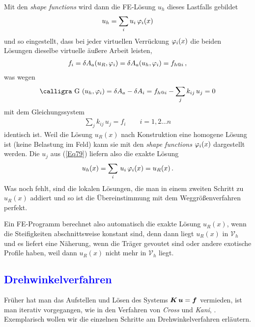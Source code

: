 {{Mit den {\em shape functions\/} wird dann die FE-L\"{o}sung $u_h $ dieses Lastfalls gebildet
\begin{align}
 u_h = \sum_i u_i\,\varphi_i(x)
\end{align}
und so eingestellt, dass bei jeder virtuellen Verr\"{u}ckung $\varphi_i(x)$ die beiden L\"{o}sungen dieselbe virtuelle \"{a}u{\ss}ere Arbeit leisten,
\begin{align}
f_i = \delta A_a(u_R,\varphi_i) = \delta A_a(u_h,\varphi_i) = f_{h @i}\,,
\end{align}
was wegen
\begin{align}
\text{\normalfont\calligra G\,\,}(u_h,\Np_i) = \delta A_a - \delta A_i = f_{h @i} - \sum_j k_{ij} \,u_j = 0
\end{align}
mit dem Gleichungssystem
\begin{align}\label{Eq79}
\sum_j k_{ij} \,u_j = f_i \qquad i = 1,2\ldots n
\end{align}
identisch ist. Weil die L\"{o}sung $u_R(x)$ nach Konstruktion eine homogene L\"{o}sung ist (keine Belastung im Feld) kann sie mit den {\em shape functions\/} $\varphi_i(x)$ dargestellt werden. Die $u_j$ aus (\ref{Eq79}) liefern also die exakte L\"{o}sung
\begin{align}
u_h(x) = \sum_i\,u_i\,\varphi_i(x) = u_R(x)\,.
\end{align}
Was noch fehlt, sind die lokalen L\"{o}sungen, die man in einem zweiten Schritt zu $u_R(x)$ addiert und so ist die \"{U}bereinstimmung mit dem Weggr\"{o}{\ss}enverfahren perfekt.

Ein FE-Programm berechnet also automatisch die exakte L\"{o}sung $u_R(x)$, wenn die Steifigkeiten abschnittsweise konstant sind, denn dann liegt $u_R(x)$ in $\mathcal{V}_h$ und es liefert eine N\"{a}herung, wenn die Tr\"{a}ger gevoutet sind oder andere exotische Profile haben, weil dann $u_R(x)$ nicht mehr in $\mathcal{V}_h$ liegt.

{\textcolor{blue}{\subsection{Drehwinkelverfahren}}}
Fr\"{u}her hat man das Aufstellen und L\"{o}sen des Systems $\mbox{\boldmath $K$}\,\mbox{\boldmath $u$} = \mbox{\boldmath $f$}$ vermieden, ist man iterativ vorgegangen, wie in den Verfahren von {\em Cross\/} und {\em Kani\/}, \cite{Hirschfeld}. Exemplarisch wollen wir die einzelnen Schritte am Drehwinkelverfahren erl\"{a}utern.\\

}}
